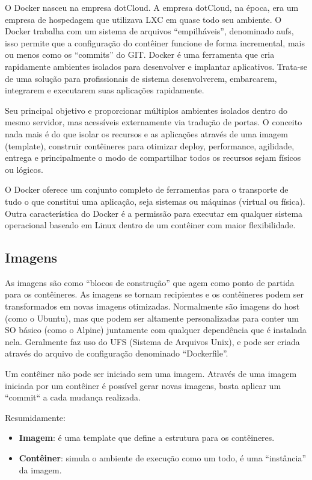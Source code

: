 \documentclass[a4paper,11pt]{article}
\begin{document}
O Docker nasceu na empresa dotCloud. A empresa dotCloud, na época, era um empresa de hospedagem que utilizava LXC em quase todo seu ambiente. O Docker trabalha com um sistema de arquivos ``empilháveis'', denominado aufs, isso permite que a configuração do contêiner funcione de forma incremental, mais ou menos como os ``commits'' do GIT. Docker é uma ferramenta que cria rapidamente ambientes isolados para desenvolver e implantar aplicativos. Trata-se de uma solução para profissionais de sistema desenvolverem, embarcarem, integrarem e executarem suas aplicações rapidamente.

Seu principal objetivo e proporcionar múltiplos ambientes isolados dentro do mesmo servidor, mas acessíveis externamente via tradução de portas. O conceito nada mais é do que isolar os recursos e as aplicações através de uma imagem (template), construir contêineres para otimizar deploy, performance, agilidade, entrega e principalmente o modo de compartilhar todos os recursos sejam físicos ou lógicos.

O Docker oferece um conjunto completo de ferramentas para o transporte de tudo o que constitui uma aplicação, seja sistemas ou máquinas (virtual ou física). Outra característica do Docker é a permissão para executar em qualquer sistema operacional baseado em Linux dentro de um contêiner com maior flexibilidade.

\subsection{Imagens}
As imagens são como ``blocos de construção'' que agem como ponto de partida para os contêineres. As imagens se tornam recipientes e os contêineres podem ser transformados em novas imagens otimizadas. Normalmente são imagens do host (como o Ubuntu), mas que podem ser altamente personalizadas para conter um SO básico (como o Alpine) juntamente com qualquer dependência que é instalada nela. Geralmente faz uso do UFS (Sistema de Arquivos Unix), e pode ser criada através do arquivo de configuração denominado ``Dockerfile''.

Um contêiner não pode ser iniciado sem uma imagem. Através de uma imagem 
iniciada por um contêiner é possível gerar novas imagens, basta aplicar um 
“commit“ a cada mudança realizada.

Resumidamente: \vspace{-1em}
\begin{itemize}
	\item \textbf{Imagem}: é uma template que define a estrutura para os contêineres.
	\item \textbf{Contêiner}: simula o ambiente de execução como um todo, é uma ``instância'' da imagem.
\end{itemize}
\end{document}
